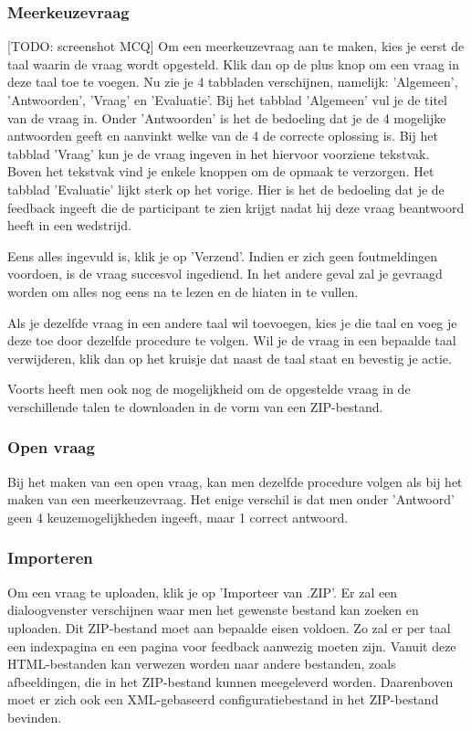 \documentclass[]{article}
\begin{document}
\subsubsection{Meerkeuzevraag}

[TODO: screenshot MCQ] Om een meerkeuzevraag aan te maken, kies je eerst de taal waarin de vraag wordt opgesteld. Klik dan op de plus knop om een vraag in deze taal toe te voegen. Nu zie je 4 tabbladen verschijnen, namelijk: 'Algemeen', 'Antwoorden', 'Vraag' en 'Evaluatie'. Bij het tabblad 'Algemeen' vul je de titel van de vraag in. Onder 'Antwoorden' is het de bedoeling dat je de 4 mogelijke antwoorden geeft en aanvinkt welke van de 4 de correcte oplossing is. Bij het tabblad 'Vraag' kun je de vraag ingeven in het hiervoor voorziene tekstvak. Boven het tekstvak vind je enkele knoppen om de opmaak te verzorgen. Het tabblad 'Evaluatie' lijkt sterk op het vorige. Hier is het de bedoeling dat je de feedback ingeeft die de participant te zien krijgt nadat hij deze vraag beantwoord heeft in een wedstrijd. 

Eens alles ingevuld is, klik je op 'Verzend'. Indien er zich geen foutmeldingen voordoen, is de vraag succesvol ingediend. In het andere geval zal je gevraagd worden om alles nog eens na te lezen en de hiaten in te vullen.

Als je dezelfde vraag in een andere taal wil toevoegen, kies je die taal en voeg je deze toe door dezelfde procedure te volgen. Wil je de vraag in een bepaalde taal verwijderen, klik dan op het kruisje dat naast de taal staat en bevestig je actie. 

Voorts heeft men ook nog de mogelijkheid om de opgestelde vraag in de verschillende talen te downloaden in de vorm van een ZIP-bestand. 

\subsubsection{Open vraag}

Bij het maken van een open vraag, kan men dezelfde procedure volgen als bij het maken van een meerkeuzevraag. Het enige verschil is dat men onder 'Antwoord' geen 4 keuzemogelijkheden ingeeft, maar 1 correct antwoord.

\subsubsection{Importeren}
Om een vraag te uploaden, klik je op 'Importeer van .ZIP'. Er zal een dialoogvenster verschijnen waar men het gewenste bestand kan zoeken en uploaden. Dit ZIP-bestand moet aan bepaalde eisen voldoen. Zo zal er per taal een indexpagina en een pagina voor feedback aanwezig moeten zijn. Vanuit deze HTML-bestanden kan verwezen worden naar andere bestanden, zoals afbeeldingen, die in het ZIP-bestand kunnen meegeleverd worden. Daarenboven moet er zich ook een XML-gebaseerd configuratiebestand in het ZIP-bestand bevinden. 
\end{document}
